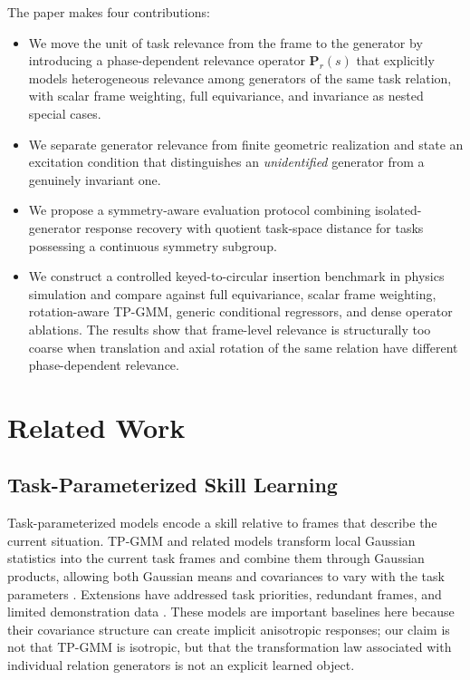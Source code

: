 \documentclass[letterpaper,10pt,conference]{ieeeconf}
\begin{document}
The paper makes four contributions:
\begin{itemize}[leftmargin=*,itemsep=1pt,topsep=2pt]
    \item We move the unit of task relevance from the frame to the generator by
    introducing a phase-dependent relevance operator
    $\mathbf P_r(s)$ that explicitly models heterogeneous relevance among
    generators of the same task relation, with scalar frame weighting, full
    equivariance, and invariance as nested special cases.
    \item We separate generator relevance from finite geometric realization and
    state an excitation condition that distinguishes an \emph{unidentified}
    generator from a genuinely invariant one.
    \item We propose a symmetry-aware evaluation protocol combining
    isolated-generator response recovery with quotient task-space distance for
    tasks possessing a continuous symmetry subgroup.
    \item We construct a controlled keyed-to-circular insertion benchmark in
    physics simulation and compare against full equivariance, scalar
    frame weighting, rotation-aware TP-GMM, generic conditional regressors, and
    dense operator ablations. The results show that frame-level relevance is
    structurally too coarse when translation and axial rotation of the same
    relation have different phase-dependent relevance.
\end{itemize}

\section{Related Work}
\label{sec:related}

\subsection{Task-Parameterized Skill Learning}

Task-parameterized models encode a skill relative to frames that describe the
current situation. TP-GMM and related models transform local Gaussian
statistics into the current task frames and combine them through Gaussian
products, allowing both Gaussian means and covariances to vary with the task
parameters \cite{Calinon2014TPGMM,Calinon2016Tutorial,Calinon2018TPModels}.
Extensions have addressed task priorities, redundant frames, and limited
demonstration data \cite{Huang2018GeneralizedTP,Silverio2019TaskPriorities,
Zhu2022FewTP}. These models are important baselines here because their
covariance structure can create implicit anisotropic responses; our claim is
not that TP-GMM is isotropic, but that the transformation law associated with
individual relation generators is not an explicit learned object.
\end{document}
